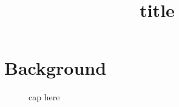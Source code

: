 \documentclass[journal abbreviation, manuscript]{copernicus}
\begin{document}
\title{title}










\maketitle




\begin{abstract}

\end{abstract}

\introduction



\section{Background}
\label{sec:background}


\begin{figure}[h!]
\centering
\caption{cap here}
\label{fig:somefig}
\end{figure}



\section{}


\codeavailability



\authorcontribution{}



\begin{acknowledgements}
\end{acknowledgements}



\end{document}
